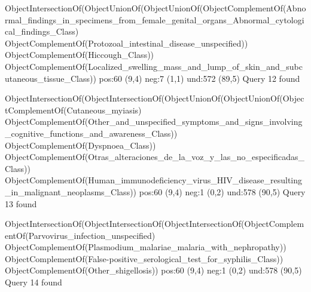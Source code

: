 ObjectIntersectionOf(ObjectUnionOf(ObjectUnionOf(ObjectComplementOf(Abnormal_findings_in_specimens_from_female_genital_organs_Abnormal_cytological_findings_Class) ObjectComplementOf(Protozoal_intestinal_disease_unspecified)) ObjectComplementOf(Hiccough_Class)) ObjectComplementOf(Localized_swelling_mass_and_lump_of_skin_and_subcutaneous_tissue_Class))
pos:60 (9,4)		 neg:7 (1,1)		 und:572 (89,5)
Query 12 found

ObjectIntersectionOf(ObjectIntersectionOf(ObjectUnionOf(ObjectUnionOf(ObjectComplementOf(Cutaneous_myiasis) ObjectComplementOf(Other_and_unspecified_symptoms_and_signs_involving_cognitive_functions_and_awareness_Class)) ObjectComplementOf(Dyspnoea_Class)) ObjectComplementOf(Otras_alteraciones_de_la_voz_y_las_no_especificadas_Class)) ObjectComplementOf(Human_immunodeficiency_virus_HIV_disease_resulting_in_malignant_neoplasms_Class))
pos:60 (9,4)		 neg:1 (0,2)		 und:578 (90,5)
Query 13 found

ObjectIntersectionOf(ObjectIntersectionOf(ObjectIntersectionOf(ObjectComplementOf(Parvovirus_infection_unspecified) ObjectComplementOf(Plasmodium_malariae_malaria_with_nephropathy)) ObjectComplementOf(False-positive_serological_test_for_syphilis_Class)) ObjectComplementOf(Other_shigellosis))
pos:60 (9,4)		 neg:1 (0,2)		 und:578 (90,5)
Query 14 found